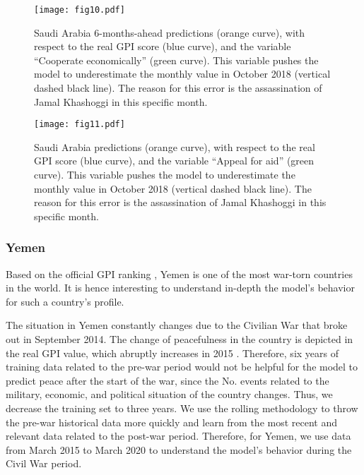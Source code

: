 \documentclass{bmcart}
\begin{document}
\begin{figure}[h!]
\centering
\texttt{[image: fig10.pdf]}
  \caption{
      Saudi Arabia 6-months-ahead predictions (orange curve), with respect to the real GPI score (blue curve), and the variable ``Cooperate economically'' (green curve). This variable pushes the model to underestimate the monthly value in October 2018 (vertical dashed black line). The reason for this error is the assassination of Jamal Khashoggi in this specific month.}
\label{fig:Cooperate_economically_SA}
\end{figure}

\begin{figure}[h!]
\centering
\texttt{[image: fig11.pdf]}
  \caption{
      Saudi Arabia predictions (orange curve), with respect to the real GPI score (blue curve), and the variable ``Appeal for aid'' (green curve). This variable pushes the model to underestimate the monthly value in October 2018 (vertical dashed black line). The reason for this error is the assassination of Jamal Khashoggi in this specific month.}
\label{fig:Appeal_aid_SA}
\end{figure}

\subsubsection*{\textbf{Yemen}}
\label{case_study_YM}
Based on the official GPI ranking \cite{gpi_site}, Yemen is one of the most war-torn countries in the world. It is hence interesting to understand in-depth the model's behavior for such a country's profile. 

The situation in Yemen constantly changes due to the Civilian War that broke out in September 2014. The change of peacefulness in the country is depicted in the real GPI value, which abruptly increases in 2015 \cite{gpi_site}.
Therefore, six years of training data related to the pre-war period would not be helpful for the model to predict peace after the start of the war, since the No. events related to the military, economic, and political situation of the country changes. 
Thus, we decrease the training set to three years. We use the rolling methodology to throw the pre-war historical data more quickly and learn from the most recent and relevant data related to the post-war period. Therefore, for Yemen, we use data from March 2015 to March 2020 to understand the model's behavior during the Civil War period. 
\end{document}

